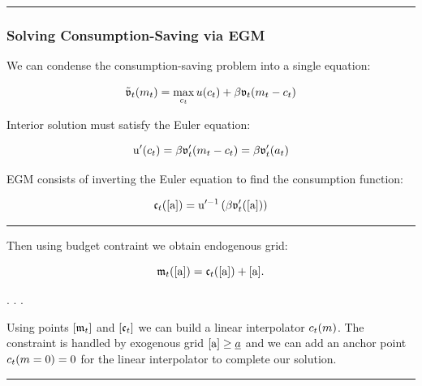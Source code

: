 \documentclass[
  letterpaper,
  DIV=11,
  numbers=noendperiod]{scrartcl}
\begin{document}
\begin{center}\rule{0.5\linewidth}{0.5pt}\end{center}

\hypertarget{solving-consumption-saving-via-egm}{%
\subsubsection{Solving Consumption-Saving via
EGM}\label{solving-consumption-saving-via-egm}}

We can condense the consumption-saving problem into a single equation:

\[\begin{equation}
\tilde{\mathfrak{v}}_{t}(m_{t}) = \max_{c_{t}} u(c_{t}) +
  \beta \mathfrak{v}_{t}(m_{t}-c_{t})
\end{equation}\]

Interior solution must satisfy the Euler equation:

\[\begin{equation}
\mathrm{u}'(c_t) = \beta \mathfrak{v}_{t}'(m_{t} - c_{t}) = \beta
  \mathfrak{v}_{t}'(a_{t})
\end{equation}\]

EGM consists of inverting the Euler equation to find the consumption
function:

\[\begin{equation}
\mathfrak{c}_{t}([\mathrm{a}]) = \mathrm{u}'^{-1}\left( \beta \mathfrak{v}_{t}'([\mathrm{a}])
  \right)
\end{equation}\]

\begin{center}\rule{0.5\linewidth}{0.5pt}\end{center}

Then using budget contraint we obtain endogenous grid:

\[\begin{equation}
  \mathfrak{m}_{t}([\mathrm{a}]) = \mathfrak{c}_{t}([\mathrm{a}]) + [\mathrm{a}].
\end{equation}\]

. . .

Using points \([\mathfrak{m}_t]\) and \([\mathfrak{c}_t]\) we can build a
linear interpolator \(c_t(m)\). The constraint is handled by
exogenous grid \([\mathrm{a}] \ge \underline{a}\) and we can add an anchor
point \(c_t(m = 0) = 0\) for the linear interpolator to complete
our solution.

\begin{center}\rule{0.5\linewidth}{0.5pt}\end{center}
\end{document}
